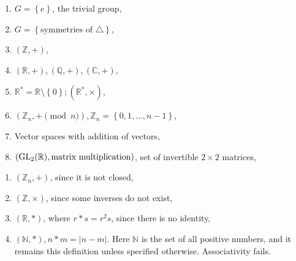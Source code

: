 \documentclass[a4paper]{article}
\begin{document}
    \begin{example}
        \begin{enumerate}[(1)]
            \item $G = \left\{ e\right\}$, the trivial group,
            \item $ G = \left\{ \text{symmetries of } \triangle \right\} $,
            \item $ (\mathbb{Z} , +) $,
            \item $ (\mathbb{R} ,+), (\mathbb{Q} , +), (\mathbb{C} , +) $,
            \item $ \mathbb{R}^* = \mathbb{R} \setminus \left\{ 0\right\}; (\mathbb{R}^*, \times) $,
            \item $ (\mathbb{Z}_n, + \pmod n), \mathbb{Z}_n = \left\{ 0,1,\dots, n-1\right\} $,
            \item Vector spaces with addition of vectors,
            \item $ (\rm{GL}_2(\mathbb{R}), \text{matrix multiplication}) $, set of invertible $2\times 2$ matrices,
        \end{enumerate}
    \end{example}
    \begin{example}
        \begin{enumerate}[(1)]
            \item $ (\mathbb{Z}_n, +) $, since it is not closed,
            \item $ (\mathbb{Z} , \times) $, since some inverses do not exist,
            \item $ (\mathbb{R} , *) $, where $ r*s = r^2 s $, since there is no identity,
            \item $ (\mathbb{N}, *), n*m = |n-m| $. Here $ \mathbb{N} $ is the set of all positive numbers, and it remains this definition unless specified otherwise. Associativity fails.
        \end{enumerate}
    \end{example}
\end{document}
